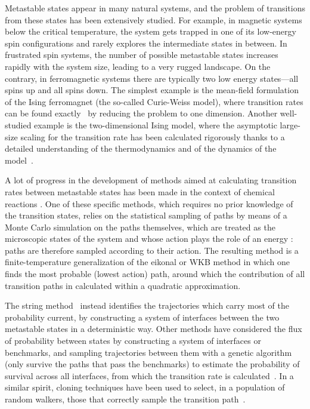\documentclass[aps,twocolumn,floats,pre,amsmath,superscriptaddress]{revtex4}
\newcommand{\<}{\langle}
\renewcommand{\>}{\rangle}
\begin{document}
Metastable states appear in many natural systems, and the problem of transitions from these states has been extensively studied.
For example, in magnetic systems below the critical temperature, the system gets trapped in one of its low-energy spin configurations 
and rarely explores the intermediate states in between. In frustrated spin systems, the number of possible metastable 
states increases rapidly with the system size, leading to a very rugged landscape. On the contrary, 
in ferromagnetic systems there are typically two low energy states---all spins up and all spins down.
The simplest example is the mean-field formulation of the Ising ferromagnet (the so-called Curie-Weiss model), where 
transition rates can be found exactly~\cite{langer} by reducing the problem to one dimension. 
Another well-studied example is the two-dimensional Ising model, 
where the asymptotic large-size scaling for the transition rate has been calculated rigorously thanks to a detailed understanding
of the thermodynamics \cite{onsager, binder, gallavotti} and of the dynamics of the model~\cite{martinelli}.



A lot of progress in the development of methods aimed at calculating transition rates between metastable states has been made 
in the context of chemical reactions \cite{hangii_review, chandler, wolynes}. One of these specific methods, 
which requires no prior knowledge of the transition states, relies on the statistical sampling of paths by means
of a Monte Carlo simulation on the paths themselves, which are treated as the microscopic states of the system 
and whose action plays the role of an energy \cite{chandler}:
paths are therefore sampled according to their action.
The resulting method is a finite-temperature generalization 
of the eikonal or WKB method in which one finds the most probable (lowest action) path, around which the contribution 
of all transition paths in calculated within a quadratic approximation. 

The string method~\cite{weinane_erik} instead identifies the trajectories which carry most of the probability current, 
by constructing a system of interfaces between the two metastable states in a deterministic way.
Other methods have considered the flux of probability between states by constructing a system of interfaces or benchmarks, 
and sampling trajectories between them with a genetic algorithm (only survive the paths that pass the benchmarks) 
to estimate the probability of survival across all interfaces, from which the transition rate is calculated~\cite{dellago2, valerianirev}.
In a similar spirit, 
cloning techniques have been used to select, in a population of random walkers, 
those that correctly sample the transition path~\cite{kurchan1,kurchan2,picciani}.
\end{document}
